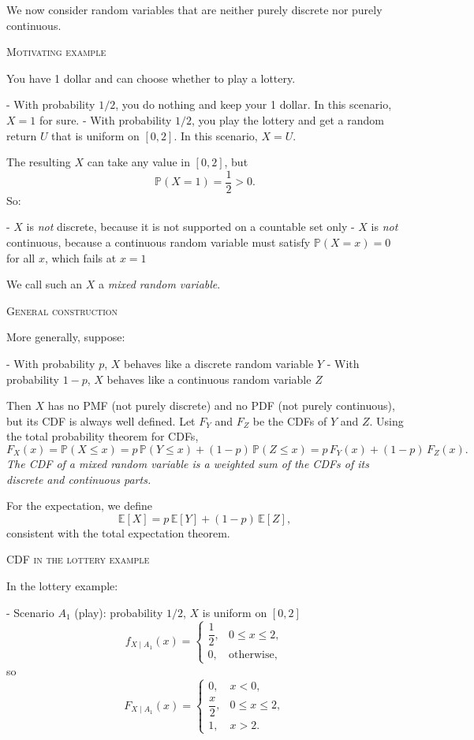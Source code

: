 We now consider random variables that are neither purely discrete nor purely continuous.

\bigskip\textsc{Motivating example}

You have 1 dollar and can choose whether to play a lottery.

- With probability \(1/2\), you do nothing and keep your 1 dollar.  
  In this scenario, \(X=1\) for sure.  
- With probability \(1/2\), you play the lottery and get a random return \(U\) that is uniform on \([0,2]\).  
  In this scenario, \(X=U\).

The resulting \(X\) can take any value in \([0,2]\), but
\[
\mathbb{P}(X = 1) = \frac{1}{2} > 0.
\]
So:

- \(X\) is \textit{not} discrete, because it is not supported on a countable set only  
- \(X\) is \textit{not} continuous, because a continuous random variable must satisfy \(\mathbb{P}(X=x)=0\) for all \(x\), which fails at \(x=1\)

We call such an \(X\) a \textit{mixed random variable}.

\bigskip\textsc{General construction}

More generally, suppose:

- With probability \(p\), \(X\) behaves like a discrete random variable \(Y\)  
- With probability \(1-p\), \(X\) behaves like a continuous random variable \(Z\)

Then \(X\) has no PMF (not purely discrete) and no PDF (not purely continuous), but its CDF is always well defined.  
Let \(F_Y\) and \(F_Z\) be the CDFs of \(Y\) and \(Z\).  
Using the total probability theorem for CDFs,
\[
F_X(x)
=
\mathbb{P}(X \le x)
=
p\,\mathbb{P}(Y \le x) + (1-p)\,\mathbb{P}(Z \le x)
=
p\,F_Y(x) + (1-p)\,F_Z(x).
\]
\textit{The CDF of a mixed random variable is a weighted sum of the CDFs of its discrete and continuous parts.}

For the expectation, we define
\[
\mathbb{E}[X]
=
p\,\mathbb{E}[Y] + (1-p)\,\mathbb{E}[Z],
\]
consistent with the total expectation theorem.

\bigskip\textsc{CDF in the lottery example}

In the lottery example:

- Scenario \(A_1\) (play): probability \(1/2\), \(X\) is uniform on \([0,2]\)  
  \[
  f_{X\mid A_1}(x) =
  \begin{cases}
  \dfrac{1}{2}, & 0 \le x \le 2,\\
  0, & \text{otherwise},
  \end{cases}
  \]
  so
  \[
  F_{X\mid A_1}(x) =
  \begin{cases}
  0, & x < 0,\\
  \dfrac{x}{2}, & 0 \le x \le 2,\\
  1, & x > 2.
  \end{cases}
  \]

